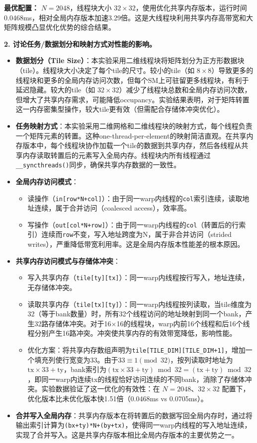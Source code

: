 \documentclass{SYSUReport}
\begin{document}
\textbf{最优配置：} $N=2048$，线程块大小 $32\times32$，使用优化共享内存版本，运行时间0.0468ms，相对全局内存版本加速3.29倍。这是大线程块利用共享内存高带宽和大矩阵规模凸显优化优势的综合结果。

\textbf{2. 讨论任务/数据划分和映射方式对性能的影响。}

\begin{itemize}
    \item \textbf{数据划分（Tile Size）}：本实验采用二维线程块将矩阵划分为正方形数据块（tile）。线程块大小决定了每个tile的尺寸。较小的tile（如 $8\times8$）导致更多的线程块和更多的全局内存访问次数，但每个SM上可驻留更多线程块，有利于延迟隐藏。较大的tile（如 $32\times32$）减少了线程块总数和全局内存访问次数，但增大了共享内存需求，可能降低occupancy。实验结果表明，对于矩阵转置这一内存密集型操作，较大tile更有效（但需配合存储体冲突优化）。

    \item \textbf{任务映射方式}：本实验采用二维网格和二维线程块的映射方式，每个线程负责一个矩阵元素的转置。这种one-thread-per-element的映射简洁直观。在共享内存版本中，每个线程块协作加载一个tile的数据到共享内存，然后各线程从共享内存读取转置后的元素写入全局内存。线程块内所有线程通过\texttt{\_\_syncthreads()}同步，确保共享内存数据的一致性。

    \item \textbf{全局内存访问模式}：
    \begin{itemize}
        \item 读操作（\texttt{in[row*N+col]}）：由于同一warp内线程的\texttt{col}索引连续，读取地址连续，属于合并访问（coalesced access），效率高。
        \item 写操作（\texttt{out[col*N+row]}）：由于同一warp内线程的\texttt{col}（转置后的行索引）连续而\texttt{row}不变，写入地址跨度为N，属于非合并访问（strided writes），严重降低带宽利用率。这是全局内存版本性能差的根本原因。
    \end{itemize}

    \item \textbf{共享内存访问模式与存储体冲突}：
    \begin{itemize}
        \item 写入共享内存（\texttt{tile[ty][tx]}）：同一warp内线程按行写入，地址连续，无存储体冲突。
        \item 读取共享内存（\texttt{tile[tx][ty]}）：同一warp内线程按列读取，当tile维度为32（等于bank数量）时，所有32个线程访问的地址映射到同一个bank，产生32路存储体冲突。对于16$\times$16的线程块，warp内前16个线程和后16个线程分别产生16路冲突。冲突使共享内存的有效带宽降低，影响性能。
        \item 优化方案：将共享内存数组声明为\texttt{tile[TILE\_DIM][TILE\_DIM+1]}，增加一个填充列使行宽变为33。由于$33 \equiv 1 \pmod{32}$，按列读取时地址为$\text{tx} \times 33 + \text{ty}$，bank索引为$(\text{tx} \times 33 + \text{ty}) \bmod 32 = (\text{tx} + \text{ty}) \bmod 32$，即同一warp内连续tx的线程恰好访问连续的不同bank，消除了存储体冲突。实验数据验证了这一优化的有效性：在 $N=2048$、$32\times32$ 配置下，优化版本比未优化版本快1.51倍（0.0468ms vs 0.0705ms）。
    \end{itemize}

    \item \textbf{合并写入全局内存}：共享内存版本在将转置后的数据写回全局内存时，通过将输出索引计算为\texttt{(bx+ty)*N+(by+tx)}，使得同一warp内线程的写入地址连续，实现了合并写入。这是共享内存版本相比全局内存版本的主要优势之一。
\end{itemize}
\end{document}

